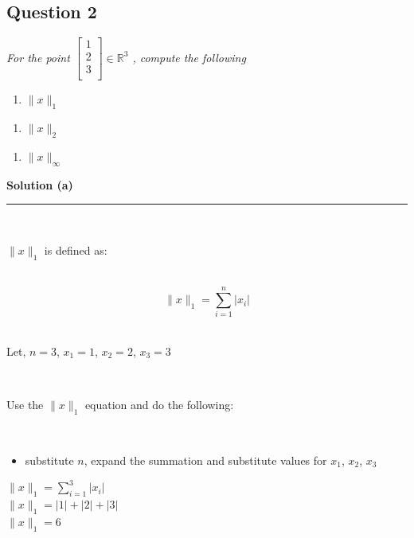 \documentclass{article}
\begin{document}
\newpage

\subsection*{Question 2}
\textit{For the point $\begin{bmatrix}
    1 \\
    2 \\
    3 \\
\end{bmatrix} \in \mathbb{R}^3$ , compute the following}\\

\begin{enumerate}[label=(a)]
  \item \textit{$\|x\|_1$}
\end{enumerate}

\begin{enumerate}[label=(b)]
  \item \textit{$\|x\|_2$}
\end{enumerate}

\begin{enumerate}[label=(c)]
  \item \textit{$\|x\|_{\infty}$}
\end{enumerate}


\textbf{Solution (a)}

\noindent\rule{\textwidth}{0.4pt}\\

\parbox{\textwidth}{$\|x\|_1$ is defined as:}\\

$$\|x\|_1 = \sum_{i=1}^{n} |x_i|$$\\

\parbox{\textwidth}{Let, $n=3$, $x_1 = 1$, $x_2 = 2$, $x_3 = 3$}\\

\parbox{\textwidth}{Use the $\|x\|_1$ equation and do the following:}\\

\begin{itemize}
    \item {substitute $n$, expand the summation and substitute values for $x_1$, $x_2$, $x_3$}
\end{itemize}

$\|x\|_1 = \sum_{i=1}^{3} |x_i|$\\

$\|x\|_1 = |1| + |2| + |3|$\\

$\|x\|_1 = 6$\\
\end{document}
